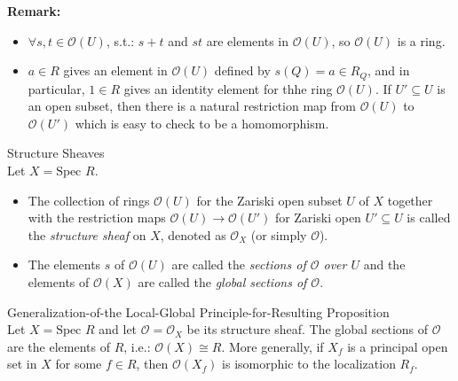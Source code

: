 \noindent\textbf{Remark:} \begin{itemize}
    \item $\forall s,t\in \mathcal{O} (U)$, s.t.: $s+t$ and $st$ are elements in $\mathcal{O} (U)$, so $\mathcal{O} (U)$ is a ring.

    \item $a\in R$ gives an element in $\mathcal{O} (U)$ defined by $s(Q)= a\in R_Q$, and in particular, $1\in R$ gives an identity element for thhe ring $\mathcal{O}(U)$. If $U'\subseteq U$ is an open subset, then there is a natural restriction map from $\mathcal{O} (U)$ to $\mathcal{O} (U')$ which is easy to check to be a homomorphism.
\end{itemize}

\begin{definition}{Structure Sheaves}\\
Let $X=\text{Spec }R$.
\begin{itemize}
    \item The collection of rings $\mathcal{O} (U)$ for the Zariski open subset $U$ of $X$ together with the restriction maps $\mathcal{O} (U) \to \mathcal{O} (U')$ for Zariski open $U' \subseteq U$ is called the \textit{structure sheaf} on $X$, denoted as $\mathcal{O}_X$ (or simply $\mathcal{O}$).

    \item The elements $s$ of $\mathcal{O} (U)$ are called the \textit{sections of $\mathcal{O}$ over $U$} and the elements of $\mathcal{O} (X)$ are called the \textit{global sections of $\mathcal{O}$}.
\end{itemize}
\end{definition}

\begin{proposition}{Generalization-of-the Local-Global Principle-for-Resulting Proposition}\\
Let $X=\text{Spec }R$ and let $\mathcal{O} =\mathcal{O}_X$ be its structure sheaf. The global sections of $\mathcal{O}$ are the elements of $R$, i.e.: $\mathcal{O} (X) \cong R$. More generally, if $X_f$ is a principal open set in $X$ for some $f\in R$, then $\mathcal{O} (X_f)$ is isomorphic to the localization $R_f$.
\end{proposition}

